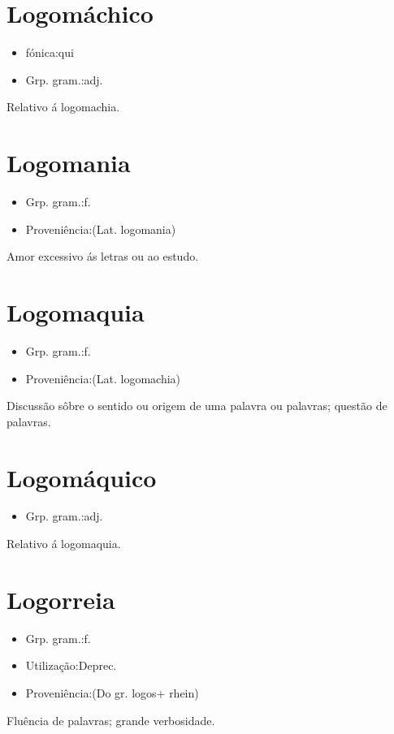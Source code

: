 \section{Logomáchico}
\begin{itemize}
\item {fónica:qui}
\end{itemize}
\begin{itemize}
\item {Grp. gram.:adj.}
\end{itemize}
Relativo á logomachia.
\section{Logomania}
\begin{itemize}
\item {Grp. gram.:f.}
\end{itemize}
\begin{itemize}
\item {Proveniência:(Lat. \textunderscore logomania\textunderscore )}
\end{itemize}
Amor excessivo ás letras ou ao estudo.
\section{Logomaquia}
\begin{itemize}
\item {Grp. gram.:f.}
\end{itemize}
\begin{itemize}
\item {Proveniência:(Lat. \textunderscore logomachia\textunderscore )}
\end{itemize}
Discussão sôbre o sentido ou origem de uma palavra ou palavras; questão de palavras.
\section{Logomáquico}
\begin{itemize}
\item {Grp. gram.:adj.}
\end{itemize}
Relativo á logomaquia.
\section{Logorreia}
\begin{itemize}
\item {Grp. gram.:f.}
\end{itemize}
\begin{itemize}
\item {Utilização:Deprec.}
\end{itemize}
\begin{itemize}
\item {Proveniência:(Do gr. \textunderscore logos\textunderscore  + \textunderscore rhein\textunderscore )}
\end{itemize}
Fluência de palavras; grande verbosidade.
